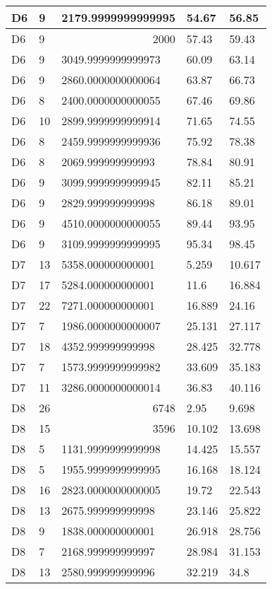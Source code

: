 \begin{longtable}{|l|l|l|l|l|}
D6 & 9 & 2179.9999999999995 & 54.67 & 56.85 \\ \hline
D6 & 9 & \multicolumn{1}{r|}{2000} & 57.43 & 59.43 \\ \hline
D6 & 9 & 3049.9999999999973 & 60.09 & 63.14 \\ \hline
D6 & 9 & 2860.0000000000064 & 63.87 & 66.73 \\ \hline
D6 & 8 & 2400.0000000000055 & 67.46 & 69.86 \\ \hline
D6 & 10 & 2899.9999999999914 & 71.65 & 74.55 \\ \hline
D6 & 8 & 2459.9999999999936 & 75.92 & 78.38 \\ \hline
D6 & 8 & 2069.999999999993 & 78.84 & 80.91 \\ \hline
D6 & 9 & 3099.9999999999945 & 82.11 & 85.21 \\ \hline
D6 & 9 & 2829.999999999998 & 86.18 & 89.01 \\ \hline
D6 & 9 & 4510.0000000000055 & 89.44 & 93.95 \\ \hline
D6 & 9 & 3109.9999999999995 & 95.34 & 98.45 \\ \hline
D7 & 13 & 5358.000000000001 & 5.259 & 10.617 \\ \hline
D7 & 17 & 5284.000000000001 & 11.6 & 16.884 \\ \hline
D7 & 22 & 7271.000000000001 & 16.889 & 24.16 \\ \hline
D7 & 7 & 1986.0000000000007 & 25.131 & 27.117 \\ \hline
D7 & 18 & 4352.999999999998 & 28.425 & 32.778 \\ \hline
D7 & 7 & 1573.9999999999982 & 33.609 & 35.183 \\ \hline
D7 & 11 & 3286.0000000000014 & 36.83 & 40.116 \\ \hline
D8 & 26 & \multicolumn{1}{r|}{6748} & 2.95 & 9.698 \\ \hline
D8 & 15 & \multicolumn{1}{r|}{3596} & 10.102 & 13.698 \\ \hline
D8 & 5 & 1131.9999999999998 & 14.425 & 15.557 \\ \hline
D8 & 5 & 1955.9999999999995 & 16.168 & 18.124 \\ \hline
D8 & 16 & 2823.0000000000005 & 19.72 & 22.543 \\ \hline
D8 & 13 & 2675.999999999998 & 23.146 & 25.822 \\ \hline
D8 & 9 & 1838.000000000001 & 26.918 & 28.756 \\ \hline
D8 & 7 & 2168.999999999997 & 28.984 & 31.153 \\ \hline
D8 & 13 & 2580.999999999996 & 32.219 & 34.8 \\ \hline

\end{longtable}
